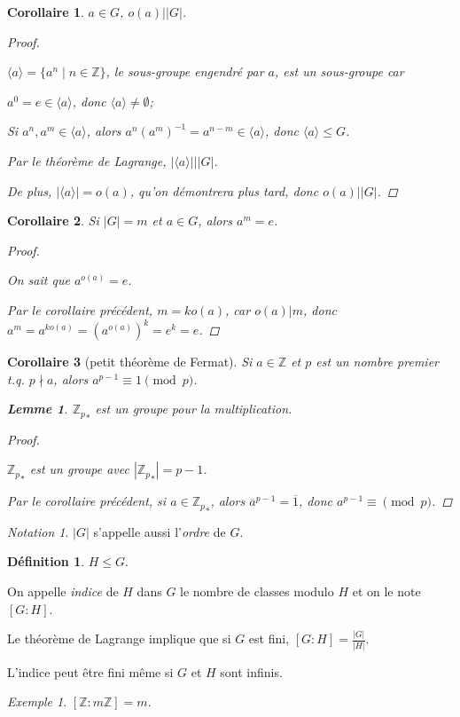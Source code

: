\documentclass{report}
\newcommand*{\card}[1]{\left| #1 \right|}
\newcommand*{\lte}{\leqslant}
\newcommand*{\entiers}{\mathbb{Z}}
\newtheorem*{lem}{Lemme}
\newtheorem*{coro}{Corollaire}
\theoremstyle{definition}
\newtheorem*{defin}{D\'efinition}
\theoremstyle{remark}
\newtheorem*{exem}{Exemple}
\newtheorem*{nota}{Notation}
\begin{document}
	\begin{coro}
		$a \in G$, $o(a) \big| \card{G}$.
		\begin{proof}~

			$\langle a \rangle = \{a^n \mid n \in \entiers\}$, le sous-groupe engendr\'e par $a$, est un sous-groupe car
			\begin{ulist}
				\item $a^0 = e \in \langle a \rangle$, donc $\langle a \rangle \neq \emptyset$;
				\item Si $a^n, a^m \in \langle a \rangle$, alors $a^n(a^m)^{-1} = a^{n-m} \in \langle a \rangle$, donc $\langle a \rangle \lte G$.
			\end{ulist}

			Par le th\'eor\`eme de Lagrange, $\card{\langle a \rangle} \big| \card{G}$.

			De plus, $\card{\langle a \rangle} = o(a)$, qu'on d\'emontrera plus tard, donc $o(a) \big| \card{G}$.
		\end{proof}
	\end{coro}
	\begin{coro}
		Si $\card{G} = m$ et $a \in G$, alors $a^m = e$.
		\begin{proof}~

			On sait que $a^{o(a)} = e$.

			Par le corollaire pr\'ec\'edent, $m = ko(a)$, car $o(a) \big| m$, donc $a^m = a^{ko(a)} = \left( a^{o(a)} \right)^k = e^k = e$.
		\end{proof}
	\end{coro}
	\begin{coro}[petit th\'eor\`eme de Fermat]
		Si $a \in \entiers$ et $p$ est un nombre premier t.q. $p \nmid a$, alors $a^{p-1} \equiv 1 \pmod{p}$.
		\begin{lem}
			${\entiers_p}_*$ est un groupe pour la multiplication.
		\end{lem}
		\begin{proof}~

			${\entiers_p}_*$ est un groupe avec $\card{{\entiers_p}_*} = p-1$.

			Par le corollaire pr\'ec\'edent, si $a \in {\entiers_p}_*$, alors $\overline{a}^{p-1}=\overline1$, donc $a^{p-1} \equiv \pmod{p}$.
		\end{proof}
	\end{coro}
	\begin{nota}
		$\card{G}$ s'appelle aussi l'\emph{ordre} de $G$.
	\end{nota}
	\begin{defin}
		$H \lte G$.

		On appelle \emph{indice} de $H$ dans $G$ le nombre de classes modulo $H$ et on le note $[G:H]$.

		Le th\'eor\`eme de Lagrange implique que si $G$ est fini, $[G:H] = \frac{\card{G}}{\card{H}}$.

		L'indice peut \^etre fini m\^eme si $G$ et $H$ sont infinis.
		\begin{exem}
			$[\entiers:m\entiers]=m$.
		\end{exem}
	\end{defin}
\end{document}
